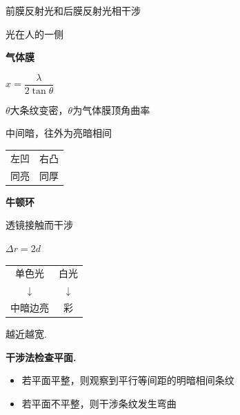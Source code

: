 
前膜反射光和后膜反射光相干涉

光在人的一侧

\textbf{气体膜}



$x=\dfrac{\lambda}{2\tan\theta}$

$\theta$大条纹变密，$\theta$为气体膜顶角\quad 曲率

中间暗，往外为亮暗相间



\begin{tabular}{@{}cc@{\qquad}}
左凹 & 右凸 \\
同亮 & 同厚
\end{tabular}

\textbf{牛顿环}

透镜接触而干涉


$\Delta r=2d$ %

\begin{tabular}{@{}c@{\qquad}c@{}}
单色光 & 白光 \\
$\downarrow$ & $\downarrow$ \\
中暗边亮 & 彩 \\
\end{tabular}
\quad 越近越宽. %

\textbf{干涉法检查平面.}


\begin{itemize}
\item 若平面平整，则观察到平行等间距的明暗相间条纹 %
\item 若平面不平整，则干涉条纹发生弯曲
\end{itemize}


